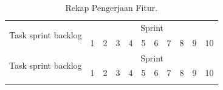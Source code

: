 \begin{longtable}{|p{7cm}|llllllllll|}
\caption{Rekap Pengerjaan Fitur.\label{table:rekap_pengerjaan_fitur}}\\
\hline
\multirow{2}{*}{Task sprint backlog}                           & \multicolumn{10}{c|}{Sprint}                                                                                                                                                                                                        \\ \cline{2-11} 
                                                               & \multicolumn{1}{l|}{1} & \multicolumn{1}{l|}{2} & \multicolumn{1}{l|}{3} & \multicolumn{1}{l|}{4} & \multicolumn{1}{l|}{5} & \multicolumn{1}{l|}{6} & \multicolumn{1}{l|}{7} & \multicolumn{1}{l|}{8} & \multicolumn{1}{l|}{9} & 10 \\ \hline
                                                               
\hline
\endfirsthead
\hline
\multirow{2}{*}{Task sprint backlog}                           & \multicolumn{10}{c|}{Sprint}                                                                                                                                                                                                        \\ \cline{2-11} 
                                                               & \multicolumn{1}{l|}{1} & \multicolumn{1}{l|}{2} & \multicolumn{1}{l|}{3} & \multicolumn{1}{l|}{4} & \multicolumn{1}{l|}{5} & \multicolumn{1}{l|}{6} & \multicolumn{1}{l|}{7} & \multicolumn{1}{l|}{8} & \multicolumn{1}{l|}{9} & 10 \\ \hline
                                                               
\hline
\endhead
\hline
\endfoot
\hline\hline
\endlastfoot


\end{longtable}
